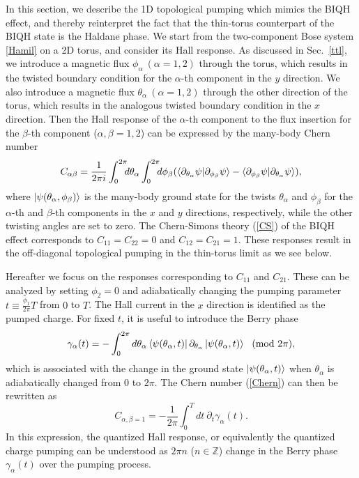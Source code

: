 \documentclass[aps,prb,twocolumn,superscriptaddress,showpacs,floatfix]{revtex4-1}
\begin{document}
In this section, we describe the 1D topological pumping which mimics the BIQH effect, and thereby reinterpret the fact that the thin-torus counterpart of the BIQH state is the Haldane phase. 
We start from the two-component Bose system \eqref{Hamil} on a 2D torus, and consider its Hall response. 
As discussed in Sec.\ \ref{ttl}, we introduce a magnetic flux $\phi_\alpha~(\alpha=1,2)$ through the torus, which results in the twisted boundary condition for the $\alpha$-th component in the $y$ direction. 
We also introduce a magnetic flux $\theta_\alpha~(\alpha=1,2)$ through the other direction of the torus, which results in the analogous twisted boundary condition in the $x$ direction. 
Then the Hall response of the $\alpha$-th component to the flux insertion for the $\beta$-th component ($\alpha, \beta=1,2$) 
can be expressed by the many-body Chern number\cite{NiuThoulessWu} 
\begin{equation}
C_{\alpha\beta}=\frac{1}{2\pi i}\int_0^{2\pi}\!\!\! d\theta_\alpha\int_0^{2\pi}\!\!\! d\phi_\beta (\braket{\partial_{\theta_\alpha}\psi|\partial_{\phi_\beta}\psi}-\braket{\partial_{\phi_\beta}\psi|\partial_{\theta_\alpha}\psi}),
\label{Chern}
\end{equation}
where $\ket{\psi(\theta_\alpha,\phi_\beta)}$ is the many-body ground state for the twists $\theta_\alpha$ and $\phi_\beta$ for the $\alpha$-th and $\beta$-th components in the $x$ and $y$ directions, respectively, while the other twisting angles are set to zero. 
The Chern-Simons theory (\ref{CS}) of the BIQH effect corresponds to $C_{11}=C_{22}=0$ and $C_{12}=C_{21}=1$. 
These responses result in the off-diagonal topological pumping in the thin-torus limit as we see below. 

Hereafter we focus on the responses corresponding to $C_{11}$ and $C_{21}$. 
These can be analyzed by setting $\phi_2=0$ and adiabatically changing the pumping parameter $t\equiv\frac{\phi_1}{2\pi}T$ from $0$ to $T$. The Hall current in the $x$ direction is identified as the pumped charge. 
For fixed $t$, it is useful to introduce the Berry phase
\begin{equation}
\gamma_\alpha(t)=-\int_0^{2\pi}d\theta_{\alpha}\bra{\psi(\theta_\alpha,t)}\partial_{\theta_\alpha}\ket{\psi(\theta_\alpha,t)} \ \  (\mathrm{mod}\ 2\pi),
\label{Berry}
\end{equation}
which is associated with the change in the ground state $\ket{\psi(\theta_\alpha, t)}$ when $\theta_\alpha$ is adiabatically changed from $0$ to $2\pi$. 
The Chern number (\ref{Chern}) can then be rewritten as
\begin{equation}
C_{\alpha,\beta=1}=-\frac{1}{2\pi}\int_0^{T}dt~ \partial_{t}\gamma_\alpha(t).
\label{Chern2}
\end{equation}
In this expression, the quantized Hall response, or equivalently the quantized charge pumping can be understood as 
$2\pi n$ ($n\in \mathbb{Z}$) change in the Berry phase $\gamma_\alpha(t)$ over the pumping process.\cite{Zaletel}
\end{document}
